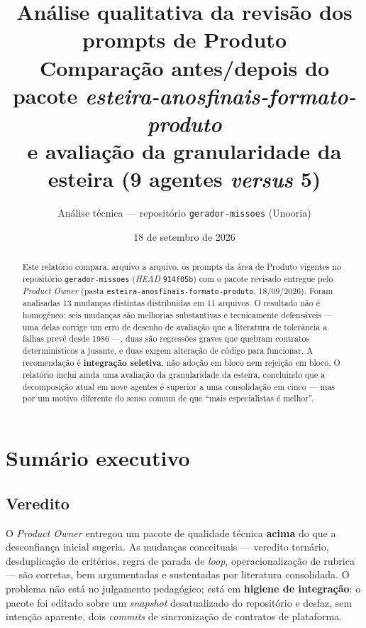 \documentclass[11pt,a4paper]{article}
\title{\textbf{Análise qualitativa da revisão dos prompts de Produto}\\[0.3em]
\large Comparação antes/depois do pacote \textit{esteira-anosfinais-formato-produto}\\
e avaliação da granularidade da esteira (9 agentes \textit{versus} 5)}
\author{Análise técnica --- repositório \texttt{gerador-missoes} (Unooria)}
\date{18 de setembro de 2026}
\newcommand{\cod}[1]{\texttt{\small #1}}
\begin{document}
\maketitle

\begin{abstract}
\noindent
Este relatório compara, arquivo a arquivo, os prompts da área de Produto vigentes no repositório
\texttt{gerador-missoes} (\textit{HEAD} \cod{914f05b}) com o pacote revisado entregue pelo \textit{Product Owner}
(pasta \texttt{esteira-anosfinais-formato-produto}, 18/09/2026). Foram analisadas 13 mudanças distintas
distribuídas em 11 arquivos. O resultado não é homogêneo: seis mudanças são melhorias substantivas e
tecnicamente defensáveis --- uma delas corrige um erro de desenho de avaliação que a literatura de
tolerância a falhas prevê desde 1986 ---, duas são regressões graves que quebram contratos determinísticos
a jusante, e duas exigem alteração de código para funcionar. A recomendação é \textbf{integração seletiva},
não adoção em bloco nem rejeição em bloco. O relatório inclui ainda uma avaliação da granularidade da
esteira, concluindo que a decomposição atual em nove agentes é superior a uma consolidação em cinco ---
mas por um motivo diferente do senso comum de que ``mais especialistas é melhor''.
\end{abstract}

\tableofcontents
\newpage

\section{Sumário executivo}

\subsection{Veredito}

O \textit{Product Owner} entregou um pacote de qualidade técnica \textbf{acima} do que a desconfiança inicial
sugeria. As mudanças conceituais --- veredito ternário, desduplicação de critérios, regra de parada de
\textit{loop}, operacionalização de rubrica --- são corretas, bem argumentadas e sustentadas por literatura
consolidada. O problema não está no julgamento pedagógico; está em \textbf{higiene de integração}:
o pacote foi editado sobre um \textit{snapshot} desatualizado do repositório e desfaz, sem intenção aparente,
dois \textit{commits} de sincronização de contratos de plataforma.
\end{document}
